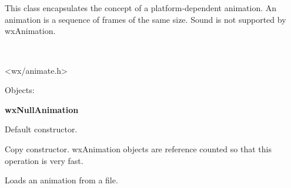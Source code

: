 
\section{}\label{wxanimation}

This class encapsulates the concept of a platform-dependent animation.
An animation is a sequence of frames of the same size.
Sound is not supported by wxAnimation.


\\


<wx/animate.h>


Objects:

{\bf wxNullAnimation}





\label{wxanimationctor}


Default constructor.


Copy constructor.
wxAnimation objects are reference counted so that this operation is very fast.


Loads an animation from a file.




\label{wxanimationdtor}

